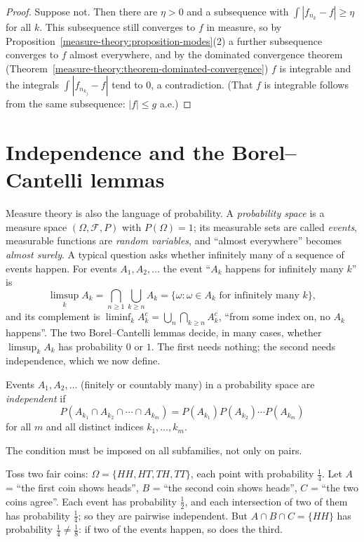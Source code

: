 \begin{proof}
Suppose not. Then there are $\eta > 0$ and a subsequence with $\int|f_{n_k} - f| \geq \eta$ for all $k$. This subsequence still converges to $f$ in measure, so by
Proposition~\ref{measure-theory:proposition-modes}(2) a further subsequence converges to $f$ almost everywhere, and by the dominated convergence theorem
(Theorem~\ref{measure-theory:theorem-dominated-convergence}) $f$ is integrable and the integrals $\int|f_{n_{k_j}} - f|$ tend to $0$, a contradiction. (That $f$ is integrable follows from the
same subsequence: $|f| \leq g$ a.e.)
\end{proof}

\section{Independence and the Borel--Cantelli lemmas}\label{measure-theory:section-borel-cantelli}

Measure theory is also the language of probability. A \emph{probability space} is a measure space $(\Omega, \mathcal{F}, P)$ with $P(\Omega) = 1$; its measurable sets are called \emph{events}, measurable
functions are \emph{random variables}, and ``almost everywhere'' becomes \emph{almost surely}. A typical question asks whether infinitely many of a sequence of events happen. For events $A_1, A_2, \ldots$
the event ``$A_k$ happens for infinitely many $k$'' is
\[
\limsup_kA_k = \bigcap_{n \geq 1}\bigcup_{k \geq n}A_k = \{\omega : \omega \in A_k \text{ for infinitely many } k\},
\]
and its complement is $\liminf_kA_k^c = \bigcup_n\bigcap_{k \geq n}A_k^c$, ``from some index on, no $A_k$ happens''. The two Borel--Cantelli lemmas decide, in many cases, whether $\limsup_kA_k$ has probability
$0$ or $1$. The first needs nothing; the second needs independence, which we now define.

\begin{definition}\label{measure-theory:definition-independent}
Events $A_1, A_2, \ldots$ (finitely or countably many) in a probability space are \emph{independent} if
\[
P(A_{k_1} \cap A_{k_2} \cap \cdots \cap A_{k_m}) = P(A_{k_1})P(A_{k_2}) \cdots P(A_{k_m})
\]
for all $m$ and all distinct indices $k_1, \ldots, k_m$.
\end{definition}

The condition must be imposed on all subfamilies, not only on pairs.

\begin{example}\label{measure-theory:example-pairwise-independent}
Toss two fair coins: $\Omega = \{HH, HT, TH, TT\}$, each point with probability $\frac14$. Let $A$ = ``the first coin shows heads'', $B$ = ``the second coin shows heads'', $C$ = ``the two coins agree''. Each
event has probability $\frac12$, and each intersection of two of them has probability $\frac14$; so they are pairwise independent. But $A \cap B \cap C = \{HH\}$ has probability $\frac14 \neq \frac18$: if
two of the events happen, so does the third.
\end{example}


